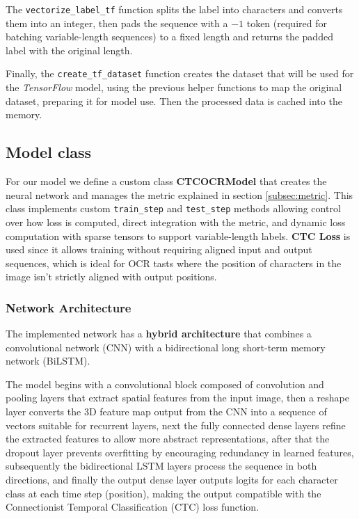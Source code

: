 \documentclass[11pt,letterpaper]{article}
\begin{document}
	The \texttt{vectorize\_label\_tf} function splits the label into characters and converts them into an integer, then pads the sequence with a $-1$ token (required for batching variable-length sequences) to a fixed length and returns the padded label with the original length.
	
	Finally, the \texttt{create\_tf\_dataset} function creates the dataset that will be used for the \textit{TensorFlow} model, using the previous helper functions to map the original dataset, preparing it for model use. Then the processed data is cached into the memory.
	
	\subsection{Model class} \label{subsec:model_class}
	For our model we define a custom class \textbf{CTCOCRModel} that creates the neural network and manages the metric explained in section \ref{subsec:metric}. This class implements custom \texttt{train\_step} and \texttt{test\_step} methods allowing control over how loss is computed, direct integration with the metric, and dynamic loss computation with sparse tensors to support variable-length labels. \textbf{CTC Loss} is used since it allows training without requiring aligned input and output sequences, which is ideal for OCR tasts where the position of characters in the image isn't strictly aligned with output positions.
	
	\subsubsection{Network Architecture}
	The implemented network has a \textbf{hybrid architecture} that combines a convolutional network (CNN) with a bidirectional long short-term memory network (BiLSTM).
	
	The model begins with a convolutional block composed of convolution and pooling layers that extract spatial features from the input image, then a reshape layer converts the 3D feature map output from the CNN into a sequence of vectors suitable for recurrent layers, next the fully connected dense layers refine the extracted features to allow more abstract representations, after that the dropout layer prevents overfitting by encouraging redundancy in learned features, subsequently the bidirectional LSTM layers process the sequence in both directions, and finally the output dense layer outputs logits for each character class at each time step (position), making the output compatible with the Connectionist Temporal Classification (CTC) loss function.
	
\end{document}
